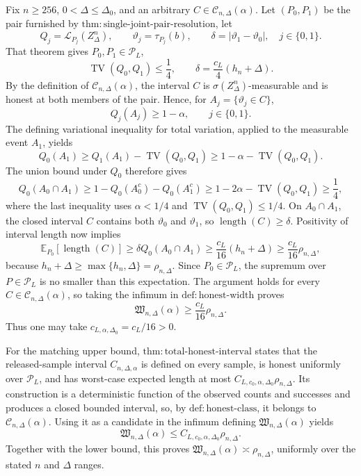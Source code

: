 Fix \(n\geq256\), \(0<\Delta\leq\Delta_0\), and an arbitrary \(C\in\mathcal C_{n,\Delta}(\alpha)\).  Let \((P_0,P_1)\) be the pair furnished by \(\mathrm{thm:single\text{-}joint\text{-}pair\text{-}resolution}\), let
\[
 Q_j=\mathcal L_{P_j}(Z_\Delta^n),
 \qquad
 \vartheta_j=\tau_{P_j}(b),
 \qquad
 \delta=|\vartheta_1-\vartheta_0|,
 \quad j\in\{0,1\}.
\]
That theorem gives \(P_0,P_1\in\mathcal P_L\),
\[
 \operatorname{TV}(Q_0,Q_1)\leq\frac14,
 \qquad
 \delta=\frac{c_L}{4}(h_n+\Delta).
\]
By the definition of \(\mathcal C_{n,\Delta}(\alpha)\), the interval \(C\) is \(\sigma(Z_\Delta^n)\)-measurable and is honest at both members of the pair.  Hence, for \(A_j=\{\vartheta_j\in C\}\),
\[
 Q_j(A_j)\geq1-\alpha,
 \qquad j\in\{0,1\}.
\]
The defining variational inequality for total variation, applied to the measurable event \(A_1\), yields
\[
 Q_0(A_1)\geq Q_1(A_1)-\operatorname{TV}(Q_0,Q_1)
 \geq1-\alpha-\operatorname{TV}(Q_0,Q_1).
\]
The union bound under \(Q_0\) therefore gives
\[
 Q_0(A_0\cap A_1)
 \geq1-Q_0(A_0^c)-Q_0(A_1^c)
 \geq1-2\alpha-\operatorname{TV}(Q_0,Q_1)
 \geq\frac14,
\]
where the last inequality uses \(\alpha<1/4\) and \(\operatorname{TV}(Q_0,Q_1)\leq1/4\).  On \(A_0\cap A_1\), the closed interval \(C\) contains both \(\vartheta_0\) and \(\vartheta_1\), so \(\operatorname{length}(C)\geq\delta\).  Positivity of interval length now implies
\[
 \mathbb E_{P_0}[\operatorname{length}(C)]
 \geq\delta Q_0(A_0\cap A_1)
 \geq\frac{c_L}{16}(h_n+\Delta)
 \geq\frac{c_L}{16}\rho_{n,\Delta},
\]
because \(h_n+\Delta\geq\max\{h_n,\Delta\}=\rho_{n,\Delta}\).  Since \(P_0\in\mathcal P_L\), the supremum over \(P\in\mathcal P_L\) is no smaller than this expectation.  The argument holds for every \(C\in\mathcal C_{n,\Delta}(\alpha)\), so taking the infimum in \(\mathrm{def:honest\text{-}width}\) proves
\[
 \mathfrak W_{n,\Delta}(\alpha)
 \geq \frac{c_L}{16}\rho_{n,\Delta}.
\]
Thus one may take \(c_{L,\alpha,\Delta_0}=c_L/16>0\).

For the matching upper bound, \(\mathrm{thm:total\text{-}honest\text{-}interval}\) states that the released-sample interval \(C_{n,\Delta,\alpha}\) is defined on every sample, is honest uniformly over \(\mathcal P_L\), and has worst-case expected length at most \(C_{L,c_0,\alpha,\Delta_0}\rho_{n,\Delta}\).  Its construction is a deterministic function of the observed counts and successes and produces a closed bounded interval, so, by \(\mathrm{def:honest\text{-}class}\), it belongs to \(\mathcal C_{n,\Delta}(\alpha)\).  Using it as a candidate in the infimum defining \(\mathfrak W_{n,\Delta}(\alpha)\) yields
\[
 \mathfrak W_{n,\Delta}(\alpha)
 \leq C_{L,c_0,\alpha,\Delta_0}\rho_{n,\Delta}.
\]
Together with the lower bound, this proves \(\mathfrak W_{n,\Delta}(\alpha)\asymp\rho_{n,\Delta}\), uniformly over the stated \(n\) and \(\Delta\) ranges.